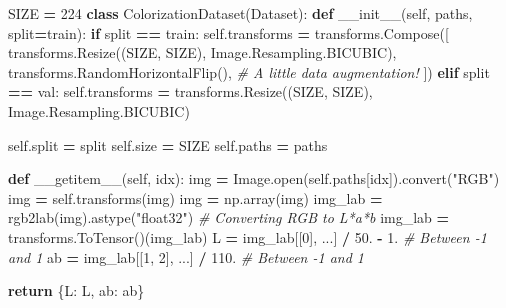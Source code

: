\documentclass[
]{article}
\newenvironment{Shaded}{\begin{snugshade}}{\end{snugshade}}
\newcommand{\BuiltInTok}[1]{#1}
\newcommand{\CommentTok}[1]{\textcolor[rgb]{0.56,0.35,0.01}{\textit{#1}}}
\newcommand{\ControlFlowTok}[1]{\textcolor[rgb]{0.13,0.29,0.53}{\textbf{#1}}}
\newcommand{\DecValTok}[1]{\textcolor[rgb]{0.00,0.00,0.81}{#1}}
\newcommand{\FloatTok}[1]{\textcolor[rgb]{0.00,0.00,0.81}{#1}}
\newcommand{\FunctionTok}[1]{\textcolor[rgb]{0.00,0.00,0.00}{#1}}
\newcommand{\KeywordTok}[1]{\textcolor[rgb]{0.13,0.29,0.53}{\textbf{#1}}}
\newcommand{\NormalTok}[1]{#1}
\newcommand{\OperatorTok}[1]{\textcolor[rgb]{0.81,0.36,0.00}{\textbf{#1}}}
\newcommand{\StringTok}[1]{\textcolor[rgb]{0.31,0.60,0.02}{#1}}
\newcommand{\VariableTok}[1]{\textcolor[rgb]{0.00,0.00,0.00}{#1}}
\begin{document}
\begin{Shaded}
\begin{Highlighting}[]
\NormalTok{SIZE }\OperatorTok{=} \DecValTok{224}
\KeywordTok{class}\NormalTok{ ColorizationDataset(Dataset):}
    \KeywordTok{def} \FunctionTok{\_\_init\_\_}\NormalTok{(}\VariableTok{self}\NormalTok{, paths, split}\OperatorTok{=}\StringTok{\textquotesingle{}train\textquotesingle{}}\NormalTok{):}
        \ControlFlowTok{if}\NormalTok{ split }\OperatorTok{==} \StringTok{\textquotesingle{}train\textquotesingle{}}\NormalTok{:}
            \VariableTok{self}\NormalTok{.transforms }\OperatorTok{=}\NormalTok{ transforms.Compose([}
\NormalTok{                transforms.Resize((SIZE, SIZE),  Image.Resampling.BICUBIC),}
\NormalTok{                transforms.RandomHorizontalFlip(), }\CommentTok{\# A little data augmentation!}
\NormalTok{            ])}
        \ControlFlowTok{elif}\NormalTok{ split }\OperatorTok{==} \StringTok{\textquotesingle{}val\textquotesingle{}}\NormalTok{:}
            \VariableTok{self}\NormalTok{.transforms }\OperatorTok{=}\NormalTok{ transforms.Resize((SIZE, SIZE),  Image.Resampling.BICUBIC)}
        
        \VariableTok{self}\NormalTok{.split }\OperatorTok{=}\NormalTok{ split}
        \VariableTok{self}\NormalTok{.size }\OperatorTok{=}\NormalTok{ SIZE}
        \VariableTok{self}\NormalTok{.paths }\OperatorTok{=}\NormalTok{ paths}
    
    \KeywordTok{def} \FunctionTok{\_\_getitem\_\_}\NormalTok{(}\VariableTok{self}\NormalTok{, idx):}
\NormalTok{        img }\OperatorTok{=}\NormalTok{ Image.}\BuiltInTok{open}\NormalTok{(}\VariableTok{self}\NormalTok{.paths[idx]).convert(}\StringTok{"RGB"}\NormalTok{)}
\NormalTok{        img }\OperatorTok{=} \VariableTok{self}\NormalTok{.transforms(img)}
\NormalTok{        img }\OperatorTok{=}\NormalTok{ np.array(img)}
\NormalTok{        img\_lab }\OperatorTok{=}\NormalTok{ rgb2lab(img).astype(}\StringTok{"float32"}\NormalTok{) }\CommentTok{\# Converting RGB to L*a*b}
\NormalTok{        img\_lab }\OperatorTok{=}\NormalTok{ transforms.ToTensor()(img\_lab)}
\NormalTok{        L }\OperatorTok{=}\NormalTok{ img\_lab[[}\DecValTok{0}\NormalTok{], ...] }\OperatorTok{/} \FloatTok{50.} \OperatorTok{{-}} \FloatTok{1.} \CommentTok{\# Between {-}1 and 1}
\NormalTok{        ab }\OperatorTok{=}\NormalTok{ img\_lab[[}\DecValTok{1}\NormalTok{, }\DecValTok{2}\NormalTok{], ...] }\OperatorTok{/} \FloatTok{110.} \CommentTok{\# Between {-}1 and 1}
        
        \ControlFlowTok{return}\NormalTok{ \{}\StringTok{\textquotesingle{}L\textquotesingle{}}\NormalTok{: L, }\StringTok{\textquotesingle{}ab\textquotesingle{}}\NormalTok{: ab\}}
    

\end{Highlighting}
\end{Shaded}
\end{document}
